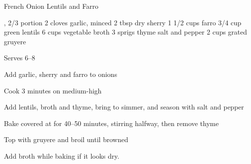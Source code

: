 \begin{recipe}{French Onion Lentils and Farro}{}
\begin{ingredients}
, 2/3 portion
2 cloves garlic, minced
2 tbsp dry sherry
1 1/2 cups farro
3/4 cup green lentils
6 cups vegetable broth
3 sprigs thyme
salt and pepper
2 cups grated gruyere
\end{ingredients}
\nextcolumn
Serves 6--8
\begin{steps}
    \item Add garlic, sherry and farro to onions
    \item Cook 3 minutes on medium-high
    \item Add lentils, broth and thyme, bring to simmer, and season with salt and pepper
    \item Bake covered at  for 40--50 minutes, stirring halfway, then remove thyme
    \item Top with gruyere and broil until browned
\end{steps}
Add broth while baking if it looks dry.
\end{recipe}
